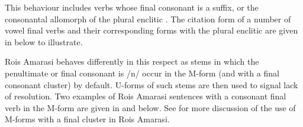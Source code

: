 \begin{exe}
	\label{ex:ConFinVerCitFor}
\end{exe}

This behaviour includes verbs whose final consonant is a suffix,
or the consonantal allomorph of the plural enclitic .
The citation form of a number of vowel final verbs
and their corresponding forms with the plural enclitic 
are given in  below to illustrate.

\begin{exe}
	\label{ex:PluVer}
\end{exe}

Ro{\Q}is Amarasi behaves differently in this respect
as stems in which the penultimate or final consonant
is /n/ occur in the M-form (and with a final consonant cluster) by default.
U-forms of such stems are then used to signal lack of resolution.
Two examples of Ro{\Q}is Amarasi sentences with a consonant final
verb in the M-form are given in 
and  below.
See  for more discussion of the
use of M-forms with a final cluster in Ro{\Q}is Amarasi.

